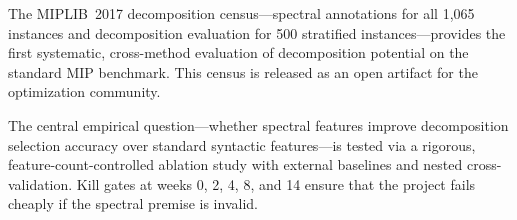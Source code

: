 \documentclass[12pt]{article}
\begin{document}
The MIPLIB~2017 decomposition census---spectral annotations for all 1,065
instances and decomposition evaluation for 500 stratified instances---provides
the first systematic, cross-method evaluation of decomposition potential on
the standard MIP benchmark.  This census is released as an open artifact
for the optimization community.

The central empirical question---whether spectral features improve
decomposition selection accuracy over standard syntactic features---is
tested via a rigorous, feature-count-controlled ablation study with
external baselines and nested cross-validation.  Kill gates at weeks 0, 2,
4, 8, and 14 ensure that the project fails cheaply if the spectral premise
is invalid.

\end{document}
